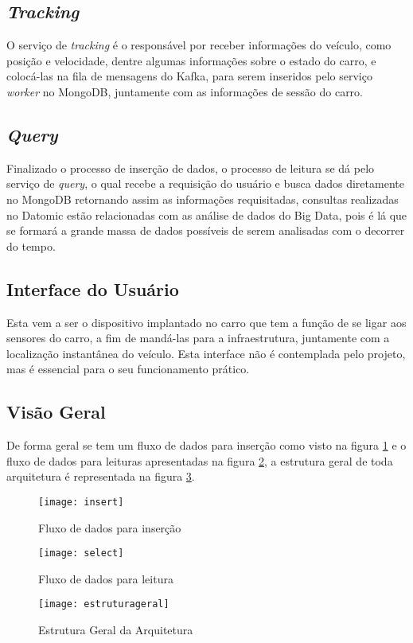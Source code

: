 \subsection{\textit{Tracking}}
O serviço de \textit{tracking} é o responsável por receber informações do veículo, como posição e velocidade, dentre algumas informações sobre o estado do carro, e colocá-las na fila de mensagens do Kafka, para serem inseridos pelo serviço \textit{worker} no MongoDB, juntamente com as informações de sessão do carro. 

\subsection{\textit{Query}}
Finalizado o processo de inserção de dados, o processo de leitura se dá pelo serviço de \textit{query}, o qual recebe a requisição do usuário e busca dados diretamente no MongoDB retornando assim as informações requisitadas, consultas realizadas no Datomic estão relacionadas com as análise de dados do Big Data, pois é lá que se formará a grande massa de dados possíveis de serem analisadas com o decorrer do tempo.

\subsection{Interface do Usuário}
Esta vem a ser o dispositivo implantado no carro que tem a função de se ligar aos sensores do carro, a fim de mandá-las para a infraestrutura, juntamente com a localização instantânea do veículo. Esta interface não é contemplada pelo projeto, mas é essencial para o seu funcionamento prático.

\subsection{Visão Geral}
De forma geral se tem um fluxo de dados para inserção como visto na figura \ref{fig:insert} e o fluxo de dados para leituras apresentadas na figura \ref{fig:select}, a estrutura geral de toda arquitetura é representada na figura \ref{fig:estruturageral}.

\begin{figure}[!h]
\caption{\label{fig:insert} Fluxo de dados para inserção}
\begin{center}
\texttt{[image: insert]}
\end{center}
\end{figure}

\begin{figure}[!h]
\caption{\label{fig:select} Fluxo de dados para leitura}
\begin{center}
\texttt{[image: select]}
\end{center}
\end{figure}

\begin{figure}[!h]
\caption{\label{fig:estruturageral} Estrutura Geral da Arquitetura}
\begin{center}
\texttt{[image: estruturageral]}
\end{center}
\end{figure}
